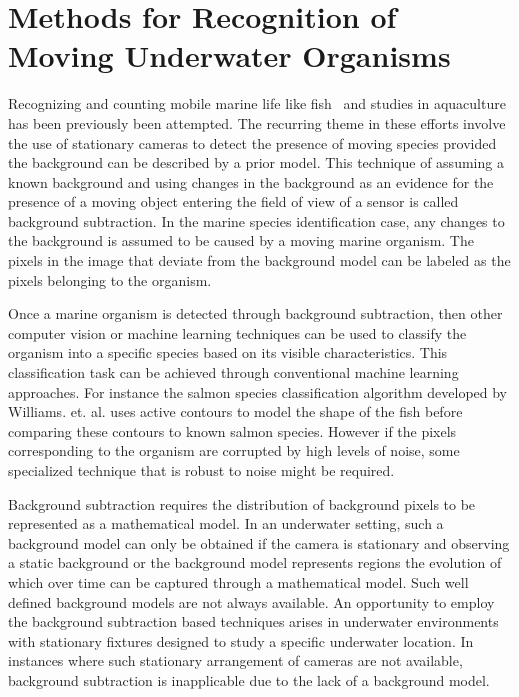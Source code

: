 \documentclass {udthesis}
\begin{document}

\section{Methods for Recognition of Moving Underwater Organisms}

Recognizing and counting mobile marine life like fish~\cite{spampinato, edgington, williams} and studies in aquaculture \cite{zion} has been previously been attempted. The recurring theme in these efforts involve the use of stationary cameras to detect the presence of moving species provided the background can be described by a prior model. This technique of assuming a known background and using changes in the background as an evidence for the presence of a moving object entering the field of view of a sensor is called background subtraction. In the marine species identification case, any changes to the background is assumed to be caused by a moving marine organism. The pixels in the image that deviate from the background model can be labeled as the pixels belonging to the organism.

Once a marine organism is detected through background subtraction, then other computer vision or machine learning techniques can be used to classify the organism into a specific species based on its visible characteristics. This classification task can be achieved through conventional machine learning approaches. For instance the salmon species classification algorithm developed by Williams. et. al. \cite{williams} uses active contours to model the shape of the fish before comparing these contours to known salmon species. However if the pixels corresponding to the organism are corrupted by high levels of noise, some specialized technique that is robust to noise might be required.

Background subtraction requires the distribution of background pixels to be represented as a mathematical model. In an underwater setting, such a background model can only be obtained if the camera is stationary and observing a static background or the background model represents regions the evolution of which over time can be captured through a mathematical model. Such well defined background models are not always available. An opportunity to employ the background subtraction based techniques arises in underwater environments with stationary fixtures designed to study a specific underwater location. In instances where such stationary arrangement of cameras are not available, background subtraction is inapplicable due to the lack of a background model.
\end{document}
